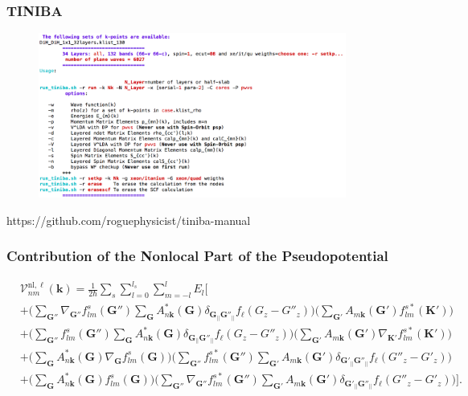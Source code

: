 \documentclass{beamer}
\begin{document}
\begin{frame}
\hypertarget{app-tiniba}{}
\frametitle{TINIBA}
\centering
\begin{figure}
\includegraphics[width=0.9\textwidth]{image-tiniba}
\end{figure}
https://github.com/roguephysicist/tiniba-manual
\end{frame}

\begin{frame}
\hypertarget{app-dpvnl}{}
\frametitle{Contribution of the Nonlocal Part of the Pseudopotential}
\tiny
\begin{equation*}\label{vnl.14}
\begin{split}
&\boldsymbol{\mathcal{V}}^{\mathrm{nl},\ell}_{nm}(\mathbf{k}) = \frac{1}{2\hbar}
\sum_s\sum_{l=0}^{l_s}\sum_{m=-l}^{l}E_{l}\Bigg[\\
&+\Bigg(\sum_{{\mathbf{G}''}}
\nabla_{{\mathbf{G}''}}f_{lm}^s({\mathbf{G}''})
\sum_{\mathbf{G}}A^{*}_{n{\mathbf{k}}}(\mathbf{G})\delta_{\mathbf{G}_{||}{\mathbf{G}''}_{||}}
f_\ell(G_z-G''_z) \Bigg)  
\Bigg( \sum_{{\mathbf{G}'}}A_{m{\mathbf{k}}}({\mathbf{G}'})f_{lm}^{s*}({\mathbf{K}'}) \Bigg)\\%
&+ \Bigg(\sum_{{\mathbf{G}''}}
f_{lm}^s({\mathbf{G}''})\sum_{\mathbf{G}}A^{*}_{n{\mathbf{k}}}(\mathbf{G})\delta_{\mathbf{G}_{||}{\mathbf{G}''}_{||}}
f_\ell(G_z-G''_z) \Bigg)  
\Bigg( \sum_{{\mathbf{G}'}}A_{m{\mathbf{k}}}({\mathbf{G}'})\nabla_{{\mathbf{K}'}}f_{lm}^{s*}({\mathbf{K}'}) \Bigg) \\
&+\Bigg(\sum_{\mathbf{G}}A^{*}_{n{\mathbf{k}}}(\mathbf{G})\nabla_{\mathbf{G}}f_{lm}^s(\mathbf{G})\Bigg)\Bigg(
\sum_{{\mathbf{G}''}}
f_{lm}^{s*}({\mathbf{G}''})\sum_{{\mathbf{G}'}}A_{m{\mathbf{k}}}({\mathbf{G}'})\delta_{{\mathbf{G}'}_{||}{\mathbf{G}''}_{||}}
f_\ell(G''_z-G'_z) \Bigg)\\ 
&+\Bigg(\sum_{\mathbf{G}}A^{*}_{n{\mathbf{k}}}(\mathbf{G})f_{lm}^s(\mathbf{G})
\Bigg) \Bigg(
\sum_{{\mathbf{G}''}}\nabla_{{\mathbf{G}''}}f_{lm}^{s*}({\mathbf{G}''})
\sum_{{\mathbf{G}'}}A_{m{\mathbf{k}}}({\mathbf{G}'})\delta_{{\mathbf{G}'}_{||}{\mathbf{G}''}_{||}}
f_\ell(G''_z-G'_z) \Bigg) \Bigg]. 
\end{split}
\end{equation*}
\end{frame}
\end{document}
